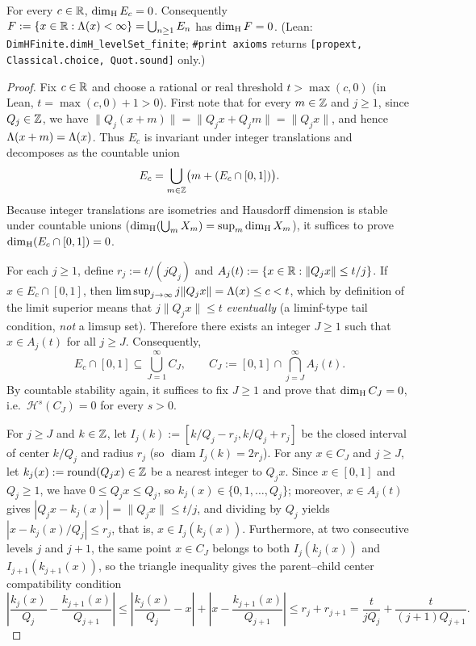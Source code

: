 \begin{theorem}\label{thm:finite}
For every $c\in\mathbb{R}$, $\dim_{\mathrm{H}} E_c=0$. Consequently
$F:=\{x\in\mathbb{R}:\Lambda(x)<\infty\}=\bigcup_{n\ge1}E_n$ has $\dim_{\mathrm{H}} F=0$.
(Lean: \texttt{DimHFinite.\allowbreak dimH\_levelSet\_finite}; \texttt{\#print axioms}
returns \texttt{[propext, Classical.choice, Quot.sound]} only.)
\end{theorem}

\begin{proof}
Fix $c\in\mathbb{R}$ and choose a rational or real threshold $t>\max(c,0)$ (in Lean,
$t=\max(c,0)+1>0$). First note that for every $m\in\mathbb{Z}$ and $j\ge1$, since
$Q_j\in\mathbb{Z}$, we have $\|Q_j(x+m)\|=\|Q_jx+Q_jm\|=\|Q_jx\|$, and hence
$\Lambda(x+m)=\Lambda(x)$. Thus $E_c$ is invariant under integer translations and
decomposes as the countable union
\[
E_c=\bigcup_{m\in\mathbb{Z}}\bigl(m+(E_c\cap[0,1])\bigr).
\]
Because integer translations are isometries and Hausdorff dimension is stable
under countable unions ($\dim_{\mathrm{H}}(\bigcup_m X_m)=\sup_m\dim_{\mathrm{H}} X_m$), it suffices to
prove $\dim_{\mathrm{H}}(E_c\cap[0,1])=0$.

For each $j\ge1$, define $r_j:=t/(jQ_j)$ and
$A_j(t):=\{x\in\mathbb{R}:\|Q_jx\|\le t/j\}$. If $x\in E_c\cap[0,1]$, then
$\limsup_{j\to\infty}j\|Q_jx\|=\Lambda(x)\le c<t$, which by definition of the limit
superior means that $j\|Q_jx\|\le t$ \emph{eventually} (a liminf-type tail
condition, \emph{not} a limsup set). Therefore there exists an integer $J\ge1$
such that $x\in A_j(t)$ for all $j\ge J$. Consequently,
\[
E_c\cap[0,1]\subseteq\bigcup_{J=1}^\infty C_J,\qquad
C_J:=[0,1]\cap\bigcap_{j=J}^\infty A_j(t).
\]
By countable stability again, it suffices to fix $J\ge1$ and prove that
$\dim_{\mathrm{H}} C_J=0$, i.e.\ $\mathcal H^s(C_J)=0$ for every $s>0$.

For $j\ge J$ and $k\in\mathbb{Z}$, let $I_j(k):=[k/Q_j-r_j,k/Q_j+r_j]$ be the closed
interval of center $k/Q_j$ and radius $r_j$ (so $\operatorname{diam}I_j(k)=2r_j$).
For any $x\in C_J$ and $j\ge J$, let $k_j(x):=\mathrm{round}(Q_jx)\in\mathbb{Z}$ be a
nearest integer to $Q_jx$. Since $x\in[0,1]$ and $Q_j\ge1$, we have
$0\le Q_jx\le Q_j$, so $k_j(x)\in\{0,1,\dots,Q_j\}$; moreover, $x\in A_j(t)$
gives $|Q_jx-k_j(x)|=\|Q_jx\|\le t/j$, and dividing by $Q_j$ yields
$|x-k_j(x)/Q_j|\le r_j$, that is, $x\in I_j(k_j(x))$. Furthermore, at two
consecutive levels $j$ and $j+1$, the same point $x\in C_J$ belongs to both
$I_j(k_j(x))$ and $I_{j+1}(k_{j+1}(x))$, so the triangle inequality gives the
parent--child center compatibility condition
\begin{equation}\label{eq:parent-child-tri}
\left|\frac{k_j(x)}{Q_j}-\frac{k_{j+1}(x)}{Q_{j+1}}\right|
\le\left|\frac{k_j(x)}{Q_j}-x\right|+\left|x-\frac{k_{j+1}(x)}{Q_{j+1}}\right|
\le r_j+r_{j+1}=\frac{t}{jQ_j}+\frac{t}{(j+1)Q_{j+1}}.
\end{equation}


\end{proof}
